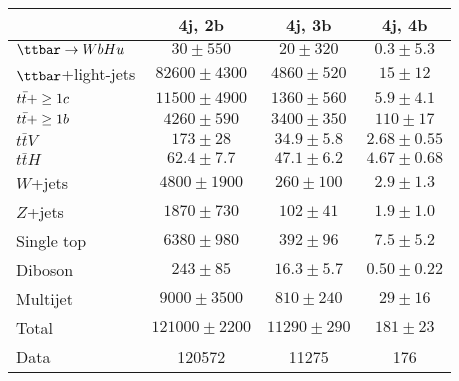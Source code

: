 \begin{table}[htbp]
\small
\begin{center}
\begin{tabular}{l*{3}{c}}
\hline\hline
 & 4j, 2b & 4j, 3b & 4j, 4b \\
\hline
$\Hu$  &   $ 30 \pm 550 $ &   $ 20 \pm 320 $ &   $ 0.3 \pm 5.3 $ \\ 
\hline
$\ttbar$+light-jets  &   $ 82600 \pm 4300 $ &   $ 4860 \pm 520 $ &   $ 15 \pm 12 $ \\ 
$t\bar{t}+\geq1c$ &   $ 11500 \pm 4900 $ &   $ 1360 \pm 560 $ &   $ 5.9 \pm 4.1 $ \\ 
$t\bar{t}+\geq1b$  &   $ 4260 \pm 590 $ &   $ 3400 \pm 350 $ &   $ 110 \pm 17 $ \\ 
$t\bar{t}V$  &   $ 173 \pm 28 $ &   $ 34.9 \pm 5.8 $ &   $ 2.68 \pm 0.55 $ \\ 
$t\bar{t}H$  &   $ 62.4 \pm 7.7 $ &   $ 47.1 \pm 6.2 $ &   $ 4.67 \pm 0.68 $ \\ 
$W$+jets  &   $ 4800 \pm 1900 $ &   $ 260 \pm 100 $ &   $ 2.9 \pm 1.3 $ \\ 
$Z$+jets  &   $ 1870 \pm 730 $ &   $ 102 \pm 41 $ &   $ 1.9 \pm 1.0 $ \\ 
Single top  &   $ 6380 \pm 980 $ &   $ 392 \pm 96 $ &   $ 7.5 \pm 5.2 $ \\ 
Diboson  &   $ 243 \pm 85 $ &   $ 16.3 \pm 5.7 $ &   $ 0.50 \pm 0.22 $ \\ 
Multijet  &   $ 9000 \pm 3500 $ &   $ 810 \pm 240 $ &   $ 29 \pm 16 $ \\ 
\hline
Total & $ 121000 \pm 2200 $ &   $ 11290 \pm 290 $ &   $ 181 \pm 23 $ \\ 
\hline
Data & 120572  & 11275  & 176  \\ 
\hline\hline      
\end{tabular}
\vspace{0.2cm}


\end{center}
\end{table}
